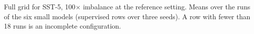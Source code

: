 \begin{table}[t]
  \centering
  \footnotesize
  
  \caption{Full grid for SST-5, 100$\times$ imbalance at the reference setting. Means over the runs of the six small models (supervised rows over three seeds). A row with fewer than 18 runs is an incomplete configuration.}
  \label{tab:grid_sst_imb100}
\end{table}
